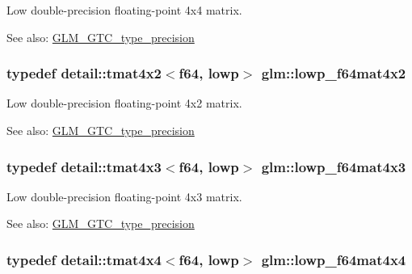 Low double-precision floating-point 4x4 matrix. \begin{Desc}
\item[See also:]\hyperlink{group__gtc__type__precision}{GLM\_\-GTC\_\-type\_\-precision} \end{Desc}
\hypertarget{group__gtc__type__precision_g37d10de43251a9a1be734bbb340ad2e7}{
\subsubsection[lowp\_\-f64mat4x2]{\setlength{\rightskip}{0pt plus 5cm}typedef detail::tmat4x2$<$f64, lowp$>$ {\bf glm::lowp\_\-f64mat4x2}}}
\label{group__gtc__type__precision_g37d10de43251a9a1be734bbb340ad2e7}


Low double-precision floating-point 4x2 matrix. \begin{Desc}
\item[See also:]\hyperlink{group__gtc__type__precision}{GLM\_\-GTC\_\-type\_\-precision} \end{Desc}
\hypertarget{group__gtc__type__precision_g05dba0f9d45301c7b10a9276c60b8a0e}{
\subsubsection[lowp\_\-f64mat4x3]{\setlength{\rightskip}{0pt plus 5cm}typedef detail::tmat4x3$<$f64, lowp$>$ {\bf glm::lowp\_\-f64mat4x3}}}
\label{group__gtc__type__precision_g05dba0f9d45301c7b10a9276c60b8a0e}


Low double-precision floating-point 4x3 matrix. \begin{Desc}
\item[See also:]\hyperlink{group__gtc__type__precision}{GLM\_\-GTC\_\-type\_\-precision} \end{Desc}
\hypertarget{group__gtc__type__precision_gb7d0922ed8d93ee3ce995858feb41231}{
\subsubsection[lowp\_\-f64mat4x4]{\setlength{\rightskip}{0pt plus 5cm}typedef detail::tmat4x4$<$f64, lowp$>$ {\bf glm::lowp\_\-f64mat4x4}}}
\label{group__gtc__type__precision_gb7d0922ed8d93ee3ce995858feb41231}


